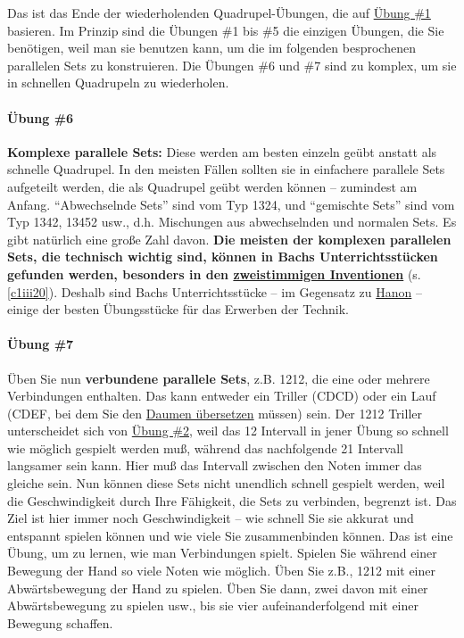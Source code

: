 Das ist das Ende der wiederholenden Quadrupel-Übungen, die auf \hyperref[c1iii7b1]{Übung \#1} basieren.
Im Prinzip sind die Übungen \#1 bis \#5 die einzigen Übungen, die Sie benötigen, weil man sie benutzen kann, um die im folgenden besprochenen parallelen Sets zu konstruieren.
Die Übungen \#6 und \#7 sind zu komplex, um sie in schnellen Quadrupeln zu wiederholen.


\paragraph{Übung \#6}
\label{c1iii7b6}

\textbf{Komplexe parallele Sets:} Diese werden am besten einzeln geübt anstatt als schnelle Quadrupel.
In den meisten Fällen sollten sie in einfachere parallele Sets aufgeteilt werden, die als Quadrupel geübt werden können -- zumindest am Anfang.
\enquote{Abwechselnde Sets} sind vom Typ 1324, und \enquote{gemischte Sets} sind vom Typ 1342, 13452 usw., d.h. Mischungen aus abwechselnden und normalen Sets.
Es gibt natürlich eine große Zahl davon.
\textbf{Die meisten der komplexen parallelen Sets, die technisch wichtig sind, können in Bachs Unterrichtsstücken gefunden werden, besonders in den \hyperref[c1iii20]{zweistimmigen Inventionen}} (s. \autoref{c1iii20}).
Deshalb sind Bachs Unterrichtsstücke -- im Gegensatz zu \hyperref[c1iii7h]{Hanon} -- einige der besten Übungsstücke für das Erwerben der Technik.


\paragraph{Übung \#7}
\label{c1iii7b7}

Üben Sie nun \textbf{verbundene parallele Sets}, z.B. 1212, die eine oder mehrere Verbindungen enthalten.
Das kann entweder ein Triller (CDCD) oder ein Lauf (CDEF, bei dem Sie den \hyperref[c1iii5a]{Daumen übersetzen} müssen) sein.
Der 1212 Triller unterscheidet sich von \hyperref[c1iii7b2]{Übung \#2}, weil das 12 Intervall in jener Übung so schnell wie möglich gespielt werden muß, während das nachfolgende 21 Intervall langsamer sein kann.
Hier muß das Intervall zwischen den Noten immer das gleiche sein.
Nun können diese Sets nicht unendlich schnell gespielt werden, weil die Geschwindigkeit durch Ihre Fähigkeit, die Sets zu verbinden, begrenzt ist.
Das Ziel ist hier immer noch Geschwindigkeit -- wie schnell Sie sie akkurat und entspannt spielen können und wie viele Sie zusammenbinden können.
Das ist eine Übung, um zu lernen, wie man Verbindungen spielt.
Spielen Sie während einer Bewegung der Hand so viele Noten wie möglich.
Üben Sie z.B., 1212 mit einer Abwärtsbewegung der Hand zu spielen.
Üben Sie dann, zwei davon mit einer Abwärtsbewegung zu spielen usw., bis sie vier aufeinanderfolgend mit einer Bewegung schaffen.

